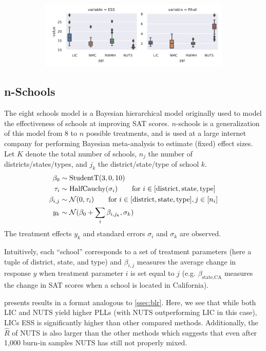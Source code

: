 \documentclass[thesis.tex]{subfiles}
\begin{document}
\begin{figure}
\begin{subfigure}[b]{\textwidth}
    \includegraphics[width=0.66\linewidth]{Figures/nschools_ess_rhat_type1.pdf}
  \end{subfigure}
\end{figure}


\subsection{n-Schools}
\label{ssec:nschools}

The eight schools model \citep{rubin1981estimation} is a Bayesian
hierarchical model originally used to model the effectiveness of schools at
improving SAT scores. $n$-schools is a generalization of this model from $8$
to $n$ possible treatments, and is used at a large internet company for
performing Bayesian meta-analysis \cite{sutton2001bayesian} to estimate
(fixed) effect sizes.
Let $K$ denote the total number of schools, $n_j$ the number of
districts/states/types, and $j_k$ the district/state/type of school $k$.
\begin{align*}
  \beta_0     & \sim \text{StudentT}(3, 0, 10)                                                                         \\
  \tau_{i}    & \sim \text{HalfCauchy}(\sigma_i) \qquad \text{for}~i \in [\text{district}, \text{state}, \text{type}]  \\
  \beta_{i,j} & \sim \mathcal{N}(0, \tau_i)  \qquad \text{for}~i \in [\text{district}, \text{state}, \text{type}], j \in [n_i] \\
  y_k         & \sim \mathcal{N}(\beta_0 + \sum_i \beta_{i,j_k}, \sigma_k)
\end{align*}
The treatment effects $y_k$ and standard errors $\sigma_i$ and $\sigma_k$ are observed.

Intuitively, each ``school'' corresponds to a set of treatment parameters
(here a tuple of district, state, and type) and $\beta_{i,j}$ measures the
average change in response $y$ when treatment parameter $i$ is set equal to
$j$ (e.g. $\beta_{\text{state},\text{CA}}$ measures the change in SAT scores
when a school is located in California).

 presents results in a format analogous to
\cref{ssec:blr}. Here, we see that while both LIC and NUTS yield higher PLLs
(with NUTS outperforming LIC in this case), LICs ESS is significantly higher
than other compared methods. Additionally, the $\widehat{R}$ of NUTS is also
larger than the other methods which suggests that even after 1,000 burn-in samples
NUTS has still not properly mixed.
\end{document}
